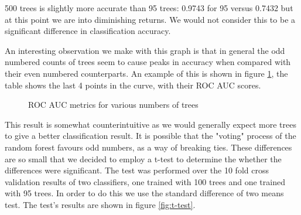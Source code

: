 \documentclass[ %
                    author={Sam Phippen},
                supervisor={Dr. Rafal Bogacz},
                     title={Real time voice activity detectors in noisy personal computing environments},
                  subtitle={},
                    degree={MEng},
                      year={2012} ]{thesis}
\begin{document}
500 trees is slightly more accurate than 95 trees: 0.9743 for 95 versus
0.7432 but at this point we are into diminishing returns. We would not consider
this to be a significant difference in classification accuracy.

An interesting observation we make with this graph is that in general the odd
numbered counts of trees seem to cause peaks in accuracy when compared with
their even numbered counterparts. An example of this is shown in
figure \ref{table:roc_spike}, the table shows the last 4 points in the curve, with their ROC
AUC scores.

\begin{figure}
    \caption{ROC AUC metrics for various numbers of trees}
    \label{table:roc_spike}
\end{figure}

This result is somewhat counterintuitive as we would generally expect more
trees to give a better classification result. It is possible that the "voting"
process of the random forest favours odd numbers, as a way of breaking ties.
These differences are so small that we decided to employ a t-test to determine
the whether the differences were significant. The test was performed over the
10 fold cross validation results of two classifiers, one trained with 100 trees
and one trained with 95 trees. In order to do this we use the standard
difference of two means test. The test's results are shown in figure
\ref{fig:t-test}.
\end{document}
